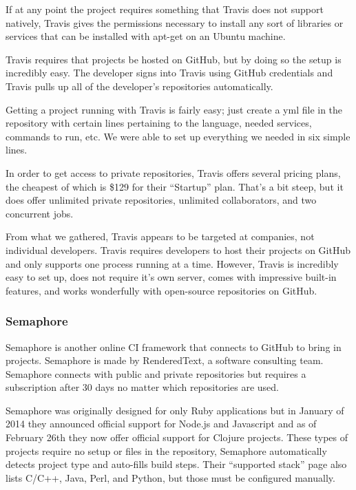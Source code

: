 \documentclass[11pt]{article}
\begin{document}
If at any point the project requires something that Travis does not support natively, Travis gives the permissions necessary to install any sort of libraries or services that can be installed with apt-get on an Ubuntu machine.

Travis requires that projects be hosted on GitHub, but by doing so the setup is incredibly easy. The developer signs into Travis using GitHub credentials and Travis pulls up all of the developer's repositories automatically. 

Getting a project running with Travis is fairly easy; just create a yml file in the repository with certain lines pertaining to the language, needed services, commands to run, etc. We were able to set up everything we needed in six simple lines.

In order to get access to private repositories, Travis offers several pricing plans, the cheapest of which is \$129 \cite{TravisPricing} for their ``Startup'' plan. That's a bit steep, but it does offer unlimited private repositories, unlimited collaborators, and two concurrent jobs. 

From what we gathered, Travis appears to be targeted at companies, not individual developers. Travis requires developers to host their projects on GitHub and only supports one process running at a time. However, Travis is incredibly easy to set up, does not require it's own server, comes with impressive built-in features, and works wonderfully with open-source repositories on GitHub.

\subsubsection{Semaphore \cite{Semaphore}}
Semaphore is another online CI framework that connects to GitHub to bring in projects. Semaphore is made by RenderedText, a software consulting team. Semaphore connects with public and private repositories but requires a subscription after 30 days no matter which repositories are used.

Semaphore was originally designed for only Ruby applications but in January of 2014 they announced official support for Node.js and Javascript and as of February 26th they now offer official support for Clojure projects.\cite{SemaphoreBlog} These types of projects require no setup or files in the repository, Semaphore automatically detects project type and auto-fills build steps. Their ``supported stack'' page also lists C/C++, Java, Perl, and Python, but those must be configured manually. 
\end{document}
